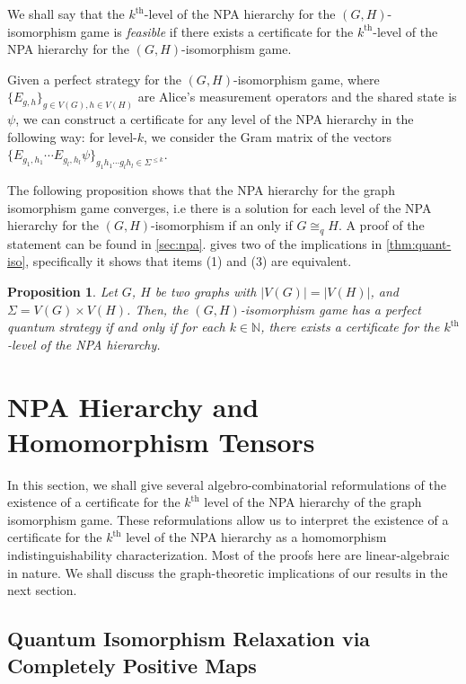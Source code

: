 \documentclass[a4paper,onecolumn,11pt,accepted=2026-01-06]{quantumarticle}
\theoremstyle{plain}
\newtheorem{prop}[thm]{Proposition}
\theoremstyle{remark}
\theoremstyle{definition}
\newcommand{\card}[1]{\left\lvert #1 \right\rvert}
\begin{document}
We shall say that the $k^{\text{th}}$-level of the NPA hierarchy for the $(G,H)$-isomorphism game is \emph{feasible} if there exists a certificate for the $k^{\text{th}}$-level of the NPA hierarchy for the $(G,H)$-isomorphism game.  

Given a perfect strategy for the $(G,H)$-isomorphism game, where $\{E_{g,h}\}_{g \in V(G), h \in V(H)}$ are Alice's measurement operators and the shared state is $\psi$, we can construct a certificate for any level of the NPA hierarchy in the following way: for level-$k$, we consider the Gram matrix of the vectors $\{E_{g_1,h_1}\cdots E_{g_l, h_l}\psi\}_{g_1h_1\cdots g_lh_l \in \Sigma^{\leq k}}$. 


The following proposition shows that the NPA hierarchy for the graph isomorphism game converges, i.e there is a solution for each level of the NPA hierarchy for the $(G,H)$-isomorphism if an only if $G \cong_{q} H$. A proof of the statement can be found in \cref{sec:npa}. 
 gives two of the implications in \cref{thm:quant-iso}, specifically it shows that items (1) and (3) are equivalent.

\begin{prop}\label{prop:conv-npa-graph}
    Let $G$, $H$ be two graphs with $\card{V(G)} = \card{V(H)}$, and $\Sigma = V(G)\times V(H)$. Then, the $(G,H)$-isomorphism game has a perfect quantum strategy if and only if for each $k \in \mathbb{N}$, there exists a certificate for the $k^{\text{th}}$-level of the NPA hierarchy. 
\end{prop}

\section{NPA Hierarchy and Homomorphism Tensors}\label{sec:npa-hom-tensors}

In this section, we shall give several algebro-combinatorial reformulations of the existence of a certificate for the $k^{\text{th}}$ level of the NPA hierarchy of the graph isomorphism game. These reformulations allow us to interpret the existence of a certificate for the $k^{\text{th}}$ level of the NPA hierarchy as a homomorphism indistinguishability characterization. 
Most of the proofs here are linear-algebraic in nature. 
We shall discuss the graph-theoretic implications of our results in the next section.   

\subsection{Quantum Isomorphism Relaxation via Completely Positive Maps}
\end{document}
